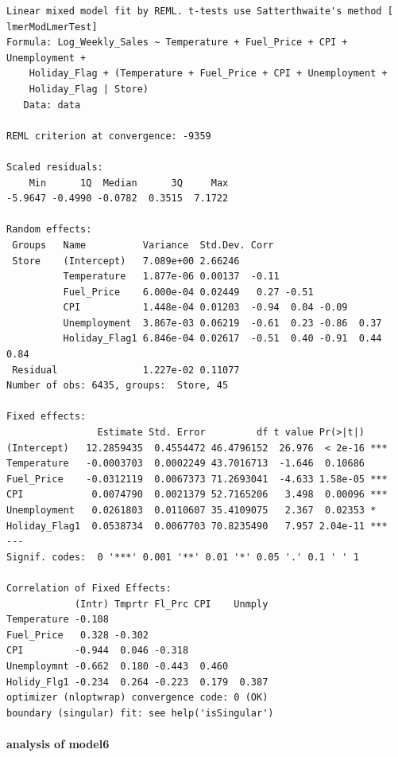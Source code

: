 \documentclass[
  letterpaper,
  DIV=11,
  numbers=noendperiod]{scrartcl}
\let\oldparagraph\paragraph
\renewcommand{\paragraph}[1]{\oldparagraph{#1}\mbox{}}
\begin{document}
\begin{verbatim}
Linear mixed model fit by REML. t-tests use Satterthwaite's method [
lmerModLmerTest]
Formula: Log_Weekly_Sales ~ Temperature + Fuel_Price + CPI + Unemployment +  
    Holiday_Flag + (Temperature + Fuel_Price + CPI + Unemployment +  
    Holiday_Flag | Store)
   Data: data

REML criterion at convergence: -9359

Scaled residuals: 
    Min      1Q  Median      3Q     Max 
-5.9647 -0.4990 -0.0782  0.3515  7.1722 

Random effects:
 Groups   Name          Variance  Std.Dev. Corr                         
 Store    (Intercept)   7.089e+00 2.66246                               
          Temperature   1.877e-06 0.00137  -0.11                        
          Fuel_Price    6.000e-04 0.02449   0.27 -0.51                  
          CPI           1.448e-04 0.01203  -0.94  0.04 -0.09            
          Unemployment  3.867e-03 0.06219  -0.61  0.23 -0.86  0.37      
          Holiday_Flag1 6.846e-04 0.02617  -0.51  0.40 -0.91  0.44  0.84
 Residual               1.227e-02 0.11077                               
Number of obs: 6435, groups:  Store, 45

Fixed effects:
                Estimate Std. Error         df t value Pr(>|t|)    
(Intercept)   12.2859435  0.4554472 46.4796152  26.976  < 2e-16 ***
Temperature   -0.0003703  0.0002249 43.7016713  -1.646  0.10686    
Fuel_Price    -0.0312119  0.0067373 71.2693041  -4.633 1.58e-05 ***
CPI            0.0074790  0.0021379 52.7165206   3.498  0.00096 ***
Unemployment   0.0261803  0.0110607 35.4109075   2.367  0.02353 *  
Holiday_Flag1  0.0538734  0.0067703 70.8235490   7.957 2.04e-11 ***
---
Signif. codes:  0 '***' 0.001 '**' 0.01 '*' 0.05 '.' 0.1 ' ' 1

Correlation of Fixed Effects:
            (Intr) Tmprtr Fl_Prc CPI    Unmply
Temperature -0.108                            
Fuel_Price   0.328 -0.302                     
CPI         -0.944  0.046 -0.318              
Unemploymnt -0.662  0.180 -0.443  0.460       
Holidy_Flg1 -0.234  0.264 -0.223  0.179  0.387
optimizer (nloptwrap) convergence code: 0 (OK)
boundary (singular) fit: see help('isSingular')
\end{verbatim}

\hypertarget{analysis-of-model6}{%
\paragraph{analysis of model6}\label{analysis-of-model6}}
\end{document}
